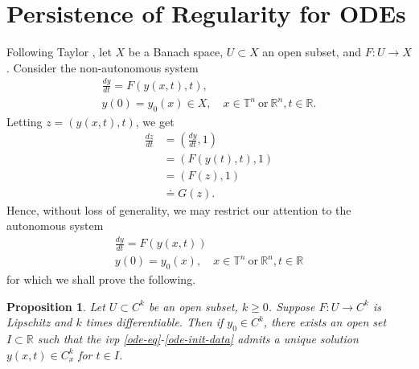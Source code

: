 \documentclass[12pt,reqno]{amsart}
\numberwithin{equation}{section}  %
\numberwithin{figure}{section}
\newcommand{\rr}{\mathbb{R}}
\newcommand{\ci}{\mathbb{T}}
\theoremstyle{plain}
\newtheorem{proposition}{Proposition}
\theoremstyle{definition}
\theoremstyle{remark}
\begin{document}
\section{Persistence of Regularity for ODEs} 
\label{sec:dep-param}
%
%
Following Taylor \cite{Taylor:1995kx}, let $X$ be a Banach space, $U \subset X$ an open subset, and $F: U \to X$. Consider the non-autonomous system
%
%
\begin{gather}
  \label{aa}
\frac{dy}{dt} = F(y(x,t), t),
\\
y(0)= y_{0}(x) \in X, \quad x \in \ci^{n} \ \text{or} \ \rr^{n},t \in \rr.
\label{bb}
\end{gather}
%
Letting $z = (y(x,t), t)$, we get
%
%
\begin{equation*}
\begin{split}
\frac{dz}{dt}  
& = \left (\frac{dy}{dt}, 1 \right )
\\
& = \left( F(y(t), t), 1 \right)
\\
& = \left( F(z), 1 \right)
\\
& \doteq G(z).
\end{split}
\end{equation*}
%
%
Hence, without loss of generality, we may restrict our attention to the
autonomous system
%
%
\begin{gather}
\frac{dy}{dt} = F\left( y(x,t) \right)
\label{ode-eq}
\\
y(0) = y_{0}(x), \quad x \in \ci^{n} \ \text{or} \ \rr^{n},t \in \rr
\label{ode-init-data}
\end{gather}
%
%
%
for which we shall prove the following.
%
%
%
%
%
%
%
%
\begin{proposition}
  Let $U \subset C^{k}$ be an open subset, $k \ge 0$. Suppose
  $F: U \to C^{k}$ is Lipschitz and $k$ times differentiable. 
  Then if $y_{0} \in C^{k}$, there exists an open set $I \subset \rr$
such that the ivp \eqref{ode-eq}-\eqref{ode-init-data}
admits a unique solution $y(x,t) \in C^{k}_{x}$ for $t \in I$. 
\label{prop:reg-result}
\end{proposition}
%
%
%
%
\end{document}
